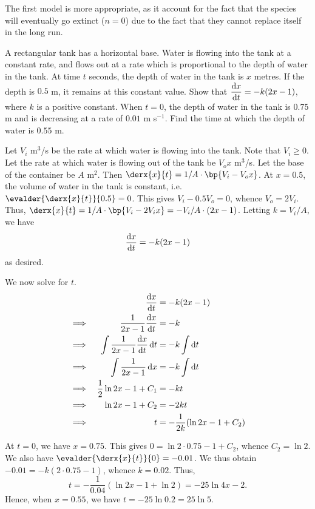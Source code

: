 \documentclass{echw}
\begin{document}
        The first model is more appropriate, as it account for the fact that the species will eventually go extinct ($n = 0$) due to the fact that they cannot replace itself in the long run.

    \problem{}
        A rectangular tank has a horizontal base. Water is flowing into the tank at a constant rate, and flows out at a rate which is proportional to the depth of water in the tank. At time $t$ seconds, the depth of water in the tank is $x$ metres. If the depth is $0.5$ m, it remains at this constant value. Show that $\dfrac{\mathrm{d} x}{\mathrm{d} t} = -k(2x-1)$, where $k$ is a positive constant. When $t = 0$, the depth of water in the tank is $0.75$ m and is decreasing at a rate of $0.01$ m s$^{-1}$. Find the time at which the depth of water is $0.55$ m.
        
    \solution
        Let $V_i$ m$^3$/s be the rate at which water is flowing into the tank. Note that $V_i \geq 0$. Let the rate at which water is flowing out of the tank be $V_o x$ m$^3$/s. Let the base of the container be $A$ m$^2$. Then $\derx{x}{t} = 1/A \cdot \bp{V_i - V_o x}$. At $x = 0.5$, the volume of water in the tank is constant, i.e. $\evalder{\derx{x}{t}}{0.5} = 0$. This gives $V_i - 0.5 V_o = 0$, whence $V_o = 2V_i$. Thus, $\derx{x}{t} = 1/A \cdot \bp{V_i - 2V_i x} = -V_i/A \cdot (2x - 1)$. Letting $k = V_i/A$, we have \[\dfrac{\mathrm{d} x}{\mathrm{d} t} = -k(2x - 1)\] as desired.

        We now solve for $t$.
        \begin{alignat*}{2}
            &&\dfrac{\mathrm{d} x}{\mathrm{d} t} &= -k(2x - 1)\\
            \implies&& \dfrac{1}{2x-1} \dfrac{\mathrm{d} x}{\mathrm{d} t} &= -k\\
            \implies&& \int \dfrac{1}{2x-1} \dfrac{\mathrm{d} x}{\mathrm{d} t} \mathop{\mathrm{d}t} &= -k \int \mathop{\mathrm{d}t}\\
            \implies&& \int \dfrac{1}{2x-1} \mathop{\mathrm{d}x} &= -k \int \mathop{\mathrm{d}t}\\
            \implies&& \dfrac12 \ln{2x-1} + C_1 &= -kt \\
            \implies&& \ln{2x-1} + C_2 &= -2kt\\
            \implies&& t &= -\dfrac{1}{2k}(\ln{2x-1} + C_2)
        \end{alignat*}

        At $t = 0$, we have $x = 0.75$. This gives $0 = \ln{2 \cdot 0.75 - 1} + C_2$, whence $C_2 = \ln2$. We also have $\evalder{\derx{x}{t}}{0} = -0.01$. We thus obtain $-0.01 = -k(2 \cdot 0.75 -1)$, whence $k = 0.02$. Thus, \[t = -\dfrac{1}{0.04}(\ln{2x-1} + \ln2) = -25 \ln{4x-2}.\] Hence, when $x = 0.55$, we have $t = -25\ln 0.2 = 25\ln5$.
\end{document}
